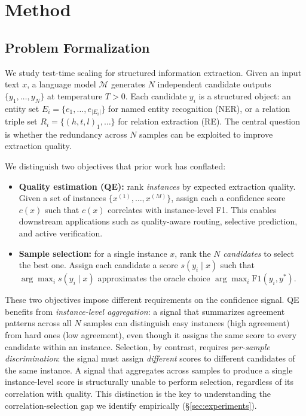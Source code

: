 \section{Method}\label{sec:method}

\subsection{Problem Formalization}

We study test-time scaling for structured information extraction.
Given an input text $x$, a language model $\mathcal{M}$ generates $N$ independent candidate outputs $\{y_1, \ldots, y_N\}$ at temperature $T > 0$.
Each candidate $y_i$ is a structured object: an entity set $E_i = \{e_1, \ldots, e_{|E_i|}\}$ for named entity recognition (NER), or a relation triple set $R_i = \{(h, t, l)_1, \ldots\}$ for relation extraction (RE).
The central question is whether the redundancy across $N$ samples can be exploited to improve extraction quality.

We distinguish two objectives that prior work has conflated:
\begin{itemize}
    \item \textbf{Quality estimation (QE):} rank \emph{instances} by expected extraction quality.
    Given a set of instances $\{x^{(1)}, \ldots, x^{(M)}\}$, assign each a confidence score $c(x)$ such that $c(x)$ correlates with instance-level F1.
    This enables downstream applications such as quality-aware routing, selective prediction, and active verification.

    \item \textbf{Sample selection:} for a single instance $x$, rank the $N$ \emph{candidates} to select the best one.
    Assign each candidate a score $s(y_i \mid x)$ such that $\arg\max_i s(y_i \mid x)$ approximates the oracle choice $\arg\max_i \mathrm{F1}(y_i, y^*)$.
\end{itemize}

These two objectives impose different requirements on the confidence signal.
QE benefits from \textit{instance-level aggregation}: a signal that summarizes agreement patterns across all $N$ samples can distinguish easy instances (high agreement) from hard ones (low agreement), even though it assigns the same score to every candidate within an instance.
Selection, by contrast, requires \textit{per-sample discrimination}: the signal must assign \emph{different} scores to different candidates of the same instance.
A signal that aggregates across samples to produce a single instance-level score is structurally unable to perform selection, regardless of its correlation with quality.
This distinction is the key to understanding the correlation-selection gap we identify empirically (\S\ref{sec:experiments}).

